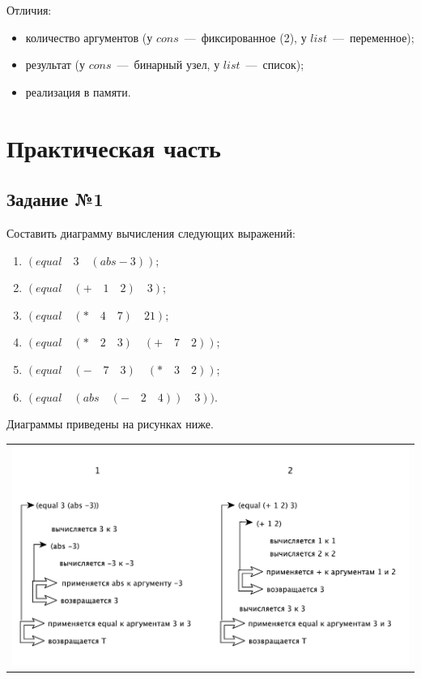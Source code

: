 Отличия:
\begin{itemize}
	\item количество аргументов (у $cons$~---~фиксированное (2), у $list$~---~переменное);
	\item результат (у $cons$~---~бинарный узел, у $list$~---~список);
	\item реализация в памяти.
\end{itemize}

\newpage

\chapter{Практическая часть}
\section{Задание №1}
Составить диаграмму вычисления следующих выражений:
\begin{enumerate}
	\item $(equal \quad 3 \quad (abs -3))$;
	\item $(equal \quad (+ \quad 1 \quad 2) \quad 3)$;
	\item $(equal \quad (* \quad 4 \quad 7) \quad 21)$;
	\item $(equal \quad (* \quad 2 \quad 3) \quad (+ \quad 7 \quad 2))$;
	\item $(equal \quad (- \quad 7 \quad 3) \quad (* \quad 3 \quad 2))$;
	\item $(equal \quad (abs \quad (- \quad 2 \quad 4)) \quad 3))$.
\end{enumerate}

Диаграммы приведены на рисунках ниже.

\begin{table}[h!]
  \centering
  \begin{tabular}{p{1\linewidth}}
    \centering
    \includegraphics[width=1\linewidth]{./images/1&2.pdf}
    \label{img:1}
  \end{tabular}
\end{table}

